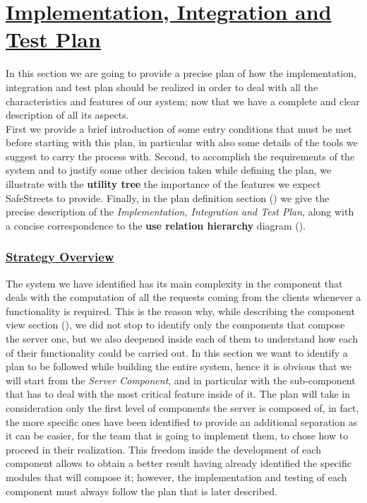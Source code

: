 \section[Implementation, Integration and Test Plan]{\hyperlink{toc}{Implementation, Integration and Test Plan}}
	\label{sec:iitPlan}
	
	In this section we are going to provide a precise plan of how the implementation, integration and test plan should be realized in order to deal with all the characteristics and features of our system; now that we have a complete and clear description of all its aspects.\\
	
	First we provide a brief introduction of some entry conditions that must be met before starting with this plan, in particular with also some details of the tools we suggest to carry the process with. Second, to accomplish the requirements of the system and to justify some other decision taken while defining the plan, we illustrate with the \textbf{utility tree} the importance of the features we expect SafeStreets to provide. Finally, in the plan definition section () we give the precise description of the \emph{Implementation, Integration and Test Plan}, along with a concise correspondence to the \textbf{use relation hierarchy} diagram ().
	
	\subsubsection[Strategy Overview]{\hyperlink{toc}{Strategy Overview}}
		\label{sec:strategyOverview}
		
		The system we have identified has its main complexity in the component that deals with the computation of all the requests coming from the clients whenever a functionality is required. This is the reason why, while describing the component view section (), we did not stop to identify only the components that compose the server one, but we also deepened inside each of them to understand how each of their functionality could be carried out. In this section we want to identify a plan to be followed while building the entire system, hence it is obvious that we will start from the \emph{Server Component}, and in particular with the sub-component that has to deal with the most critical feature inside of it. The plan will take in consideration only the first level of components the server is composed of, in fact, the more specific ones have been identified to provide an additional separation as it can be easier, for the team that is going to implement them, to chose how to proceed in their realization. This freedom inside the development of each component allows to obtain a better result having already identified the specific modules that will compose it; however, the implementation and testing of each component must always follow the plan that is later described.\\
		
